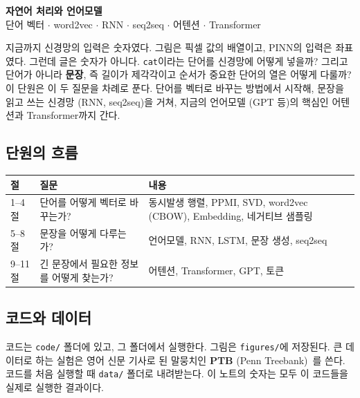 \documentclass[11pt,a4paper]{article}
\newcommand{\w}[1]{\texttt{#1}}
\begin{document}

\begin{center}
{\LARGE\bfseries 자연어 처리와 언어모델}\\[0.35em]
{\large 단어 벡터 $\cdot$ word2vec $\cdot$ RNN $\cdot$ seq2seq $\cdot$ 어텐션 $\cdot$ Transformer}\\[0.8em]
\end{center}

\vspace{0.4em}

\begin{keybox}[이번 단원의 핵심 질문]
지금까지 신경망의 입력은 숫자였다. 그림은 픽셀 값의 배열이고, PINN의 입력은 좌표였다.
그런데 글은 숫자가 아니다. \w{cat}이라는 단어를 신경망에 어떻게 넣을까?
그리고 단어가 아니라 \textbf{문장}, 즉 길이가 제각각이고 순서가 중요한 단어의 열은 어떻게 다룰까?
이 단원은 이 두 질문을 차례로 푼다. 단어를 벡터로 바꾸는 방법에서 시작해, 문장을 읽고 쓰는 신경망 (RNN, seq2seq)을 거쳐, 지금의 언어모델 (GPT 등)의 핵심인 어텐션과 Transformer까지 간다.
\end{keybox}

\subsection*{단원의 흐름}

\begin{center}
\begin{tabular}{@{}lp{56mm}p{64mm}@{}}
\toprule
절 & 질문 & 내용 \\
\midrule
1--4절 & 단어를 어떻게 벡터로 바꾸는가? & 동시발생 행렬, PPMI, SVD, word2vec (CBOW), Embedding, 네거티브 샘플링 \\
5--8절 & 문장을 어떻게 다루는가? & 언어모델, RNN, LSTM, 문장 생성, seq2seq \\
9--11절 & 긴 문장에서 필요한 정보를 어떻게 찾는가? & 어텐션, Transformer, GPT, 토큰 \\
\bottomrule
\end{tabular}
\end{center}

\subsection*{코드와 데이터}

코드는 \texttt{code/} 폴더에 있고, 그 폴더에서 실행한다. 그림은 \texttt{figures/}에 저장된다.
큰 데이터로 하는 실험은 영어 신문 기사로 된 말뭉치인 \textbf{PTB} (Penn Treebank)~\cite{marcus1993}를 쓴다. 코드를 처음 실행할 때 \texttt{data/} 폴더로 내려받는다.
이 노트의 숫자는 모두 이 코드들을 실제로 실행한 결과이다.
\end{document}
